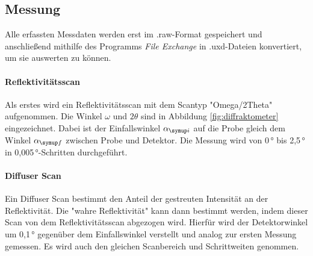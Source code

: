 

 
\newpage
\subsection{Messung}
Alle erfassten Messdaten werden erst im .raw-Format gespeichert und anschließend 
mithilfe des Programms \textit{File Exchange} in .uxd-Dateien konvertiert, um sie auswerten zu können.

\paragraph{Reflektivitätsscan}
Als erstes wird ein Reflektivitätsscan mit dem Scantyp "Omega/2Theta" aufgenommen. Die Winkel $\omega$ und $2\theta$ sind in 
Abbildung \ref{fig:diffraktometer} eingezeichnet.
Dabei ist der Einfallswinkel $\alpha\idx{i}$ auf die Probe gleich dem Winkel $\alpha\idx{f}$ zwischen Probe und Detektor.
Die Messung wird von 0\,° bis 2,5\,° in 0,005\,°-Schritten durchgeführt.

\paragraph{Diffuser Scan}
Ein Diffuser Scan bestimmt den Anteil der gestreuten Intensität an der Reflektivität. Die "wahre Reflektivität"
kann dann bestimmt werden, indem dieser Scan von dem Reflektivitätsscan abgezogen wird.
Hierfür wird der Detektorwinkel um 0,1\,° gegenüber dem Einfallswinkel verstellt und analog zur ersten Messung gemessen.
Es wird auch den gleichen Scanbereich und Schrittweiten genommen.





